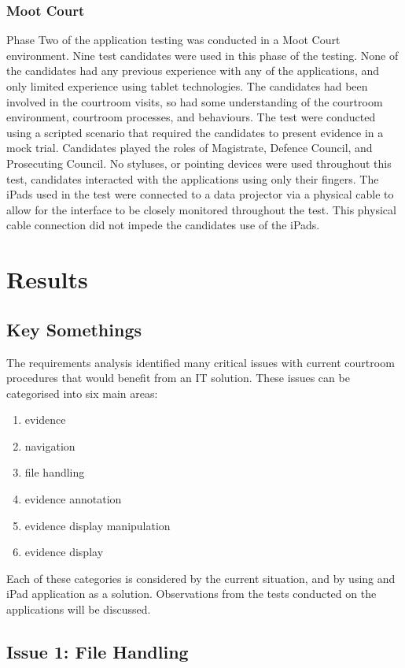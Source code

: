 \documentclass{article}
\begin{document}
\subsubsection{Moot Court}
Phase Two of the application testing was conducted in a Moot Court environment. Nine test candidates were used in this phase of the testing. None of the candidates had any previous experience with any of the applications, and only limited experience using tablet technologies. The candidates had been involved in the courtroom visits, so had some understanding of the courtroom environment, courtroom processes, and behaviours. The test were conducted using a scripted scenario that required the candidates to present evidence in a mock trial. Candidates played the roles of Magistrate, Defence Council, and Prosecuting Council. No styluses, or pointing devices were used throughout this test, candidates interacted with the applications using only their fingers. The iPads used in the test were connected to a data projector via a physical cable to allow for the interface to be closely monitored throughout the test. This physical cable connection did not impede the candidates use of the iPads.

\section{Results}
\subsection{Key Somethings}
The requirements analysis identified many critical issues with current courtroom procedures that would benefit from an IT solution. These issues can be categorised into six main areas:
 
\begin{enumerate}
\item evidence 
\item navigation
\item file handling
\item evidence annotation
\item evidence display manipulation
\item evidence display
\end{enumerate}
Each of these categories is considered by the current situation, and by using and iPad application as a solution. Observations from the tests conducted on the applications will be discussed.
 \subsection{Issue 1: File Handling}
\end{document}
